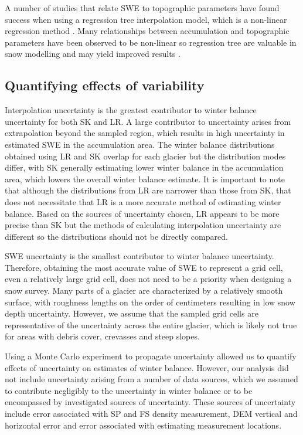 \documentclass[twocolumn, letterpaper]{igs}
\begin{document}
A number of studies that relate SWE to topographic parameters have found success when using a regression tree interpolation model, which is a non-linear regression method \citep[e.g.][]{Elder1998, Erickson2005, Lopez2010}. Many relationships between accumulation and topographic parameters have been observed to be non-linear so regression tree are valuable in snow modelling and may yield improved results \citep{Erxleben2002, Molotch2005}. 

\subsection{Quantifying effects of variability}

Interpolation uncertainty is the greatest contributor to winter balance uncertainty for both SK and LR. A large contributor to uncertainty arises from extrapolation beyond the sampled region, which results in high uncertainty in estimated SWE in the accumulation area. The winter balance distributions obtained using LR and SK overlap for each glacier but the distribution modes differ, with SK generally estimating lower winter balance in the accumulation area, which lowers the overall winter balance estimate. It is important to note that although the distributions from LR are narrower than those from SK, that does not necessitate that LR is a more accurate method of estimating winter balance. Based on the sources of uncertainty chosen, LR appears to be more precise than SK but the methods of calculating interpolation uncertainty are different so the distributions should not be directly compared. 

SWE uncertainty is the smallest contributor to winter balance uncertainty. Therefore, obtaining the most accurate value of SWE to represent a grid cell, even a relatively large grid cell, does not need to be a priority when designing a snow survey. Many parts of a glacier are characterized by a relatively smooth surface, with roughness lengths on the order of centimeters \citep{Hock2005} resulting in low snow depth uncertainty. However, we assume that the sampled grid cells are representative of the uncertainty across the entire glacier, which is likely not true for areas with debris cover, crevasses and steep slopes. 

Using a Monte Carlo experiment to propagate uncertainty allowed us to quantify effects of uncertainty on estimates of winter balance. However, our analysis did not include uncertainty arising from a number of data sources, which we assumed to contribute negligibly to the uncertainty in winter balance or to be encompassed by investigated sources of uncertainty. These sources of uncertainty include error associated with SP and FS density measurement, DEM vertical and horizontal error and error associated with estimating measurement locations.
\end{document}
